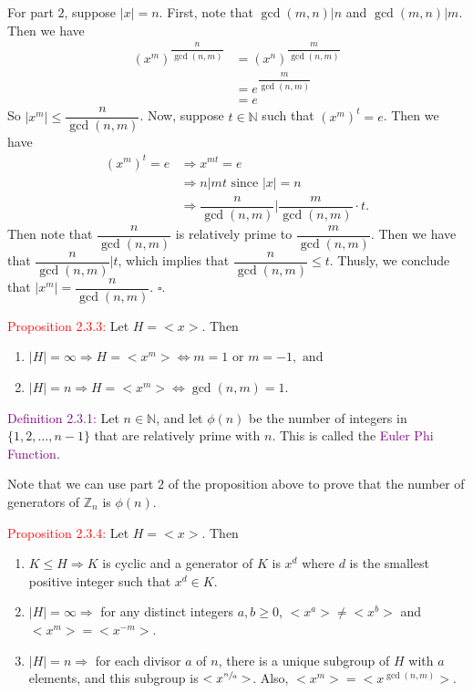 \documentclass{article}
\begin{document}
For part $2$, suppose $|x|=n$. First, note that $\gcd{(m,n)} \big| n$ and $\gcd{(m,n)} \big| m$. Then we have
\begin{align*}
    (x^m)^{\dfrac{n}{\gcd{(n,m)}}} &= (x^n)^{\dfrac{m}{\gcd{(n,m)}}} \\
    &= e^{\dfrac{m}{\gcd{(n,m)}}} \\
    &=e
\end{align*}
So $|x^m| \leq \dfrac{n}{\gcd{(n,m)}}$. Now, suppose $t \in \mathbb{N}$ such that $(x^m)^t =e$. Then we have
\begin{align*}
    (x^m)^t = e &\Longrightarrow x^{mt}=e \\
    &\Longrightarrow n \big| mt \text{ since } |x|=n \\
    &\Longrightarrow \dfrac{n}{\gcd{(n,m)}} \bigg| \dfrac{m}{\gcd{(n,m)}} \cdot t.
\end{align*}
Then note that $\dfrac{n}{\gcd{(n,m)}}$ is relatively prime to $\dfrac{m}{\gcd{(n,m)}}$. Then we have that $\dfrac{n}{\gcd{(n,m)}} \bigg| t$, 
which implies that $\dfrac{n}{\gcd{(n,m)}} \leq t$. Thusly, we conclude that $|x^m| = \dfrac{n}{\gcd{(n,m)}}$. $\square$.

\textcolor{red}{Proposition 2.3.3:} Let $H = <x>$. Then 
\begin{enumerate}
    \item $|H| = \infty \Longrightarrow H = <x^m> \Longleftrightarrow m=1 \text{ or } m=-1, \text{ and } $
    \item $|H| = n \Longrightarrow H = <x^m> \Longleftrightarrow \gcd{(n,m)} = 1$.
\end{enumerate}

\textcolor{purple}{Definition 2.3.1:} Let $n \in \mathbb{N}$, and let $\phi(n)$ be the number of integers in $\{1,2, \dots, n-1\}$ that 
are relatively prime with $n$. This is called the \textcolor{purple}{Euler Phi Function}.

Note that we can use part $2$ of the proposition above to prove that the number of generators of $\mathbb{Z}_n$ is $\phi(n)$.

\textcolor{red}{Proposition 2.3.4:} Let $H = <x>$. Then
\begin{enumerate}
    \item $K \leq H \Longrightarrow K$ is cyclic and a generator of $K$ is $x^d$ where $d$ is the smallest positive integer such that 
    $x^d \in K$.
    \item $|H| = \infty \Longrightarrow$ for any distinct integers $a,b \geq 0$, $<x^a> \neq <x^b>$ and $<x^m>=<x^{-m}>$.
    \item $|H| = n \Longrightarrow$ for each divisor $a$ of $n$, there is a unique subgroup of $H$ with $a$ elements, and this subgroup is 
    $<x^{\sfrac{n}{a}}>$. Also, $<x^m> = <x^{\gcd{(n,m)}}>$.
\end{enumerate}
\end{document}
